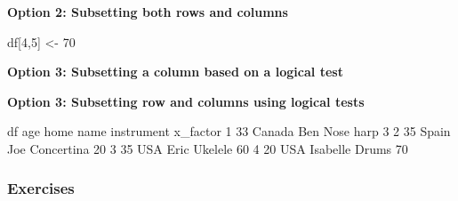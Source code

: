 \documentclass[
]{book}
\newenvironment{Shaded}{\begin{snugshade}}{\end{snugshade}}
\newcommand{\DecValTok}[1]{\textcolor[rgb]{0.00,0.00,0.81}{#1}}
\newcommand{\FunctionTok}[1]{\textcolor[rgb]{0.13,0.29,0.53}{\textbf{#1}}}
\newcommand{\NormalTok}[1]{#1}
\newcommand{\OtherTok}[1]{\textcolor[rgb]{0.56,0.35,0.01}{#1}}
\newcommand{\SpecialCharTok}[1]{\textcolor[rgb]{0.81,0.36,0.00}{\textbf{#1}}}
\newcommand{\StringTok}[1]{\textcolor[rgb]{0.31,0.60,0.02}{#1}}
\begin{document}
\textbf{Option 2: Subsetting both rows and columns}

\begin{Shaded}
\begin{Highlighting}[]
\NormalTok{df[}\DecValTok{4}\NormalTok{,}\DecValTok{5}\NormalTok{] }\OtherTok{\textless{}{-}} \DecValTok{70}
\end{Highlighting}
\end{Shaded}

\textbf{Option 3: Subsetting a column based on a logical test}

\begin{Shaded}
\end{Shaded}

\textbf{Option 3: Subsetting row and columns using logical tests}

\begin{Shaded}
\end{Shaded}

\begin{Shaded}
\begin{Highlighting}[]
\NormalTok{df}
\NormalTok{  age   home     name instrument x\_factor}
\DecValTok{1}  \DecValTok{33}\NormalTok{ Canada      Ben  Nose harp        }\DecValTok{3}
\DecValTok{2}  \DecValTok{35}\NormalTok{  Spain      Joe Concertina       }\DecValTok{20}
\DecValTok{3}  \DecValTok{35}\NormalTok{    USA     Eric    Ukelele       }\DecValTok{60}
\DecValTok{4}  \DecValTok{20}\NormalTok{    USA Isabelle      Drums       }\DecValTok{70}
\end{Highlighting}
\end{Shaded}

\subsubsection*{Exercises}\label{exercises-5}
\end{document}
